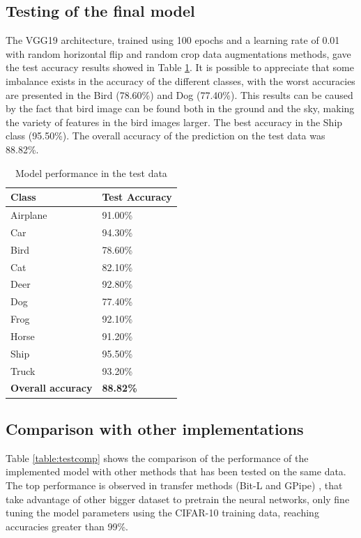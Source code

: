 \documentclass[10pt,twocolumn,letterpaper]{article}
\begin{document}
\subsection{Testing of the final model}

The VGG19 architecture, trained using 100 epochs and a learning rate of 0.01 with random horizontal flip and random crop data augmentations methods, gave the test accuracy results showed in Table \ref{table:test}. It is possible to appreciate that some imbalance exists in the accuracy of the different classes, with the worst accuracies are presented in the Bird (78.60\%) and Dog (77.40\%). This results can be caused by the fact that bird image can be found both in the ground and the sky, making the variety of features in the bird images larger. The best accuracy in the Ship class (95.50\%). The overall accuracy of the prediction on the test data was 88.82\%.

\begin{table}[h]
	\begin{center}
		\begin{tabular}{|p{3cm}|p{2.5cm}|}
			\hline
			Class & Test Accuracy \\
			\hline\hline
			Airplane & 91.00\%  \\
			Car & 94.30\% \\
			Bird & 78.60\% \\
			Cat & 82.10\% \\
			Deer & 92.80\%  \\
			Dog & 77.40\% \\
			Frog & 92.10\% \\
			Horse & 91.20\% \\
			Ship & 95.50\% \\
			Truck & 93.20\% \\
			\textbf{Overall accuracy} & \textbf{88.82\%} \\
			\hline
		\end{tabular}
	\end{center}
	\caption{Model performance in the test data}
	\label{table:test}
\end{table}

\subsection{Comparison with other implementations}

Table \ref{table:testcomp} shows the comparison of the performance of the implemented model with other methods that has been tested on the same data. The top performance is observed in transfer methods (Bit-L and GPipe) \cite{Kolesnikov2019,Huang2018}, that take advantage of other bigger dataset to pretrain the neural networks, only fine tuning the model parameters using the CIFAR-10 training data, reaching accuracies greater than 99\%.
\end{document}
